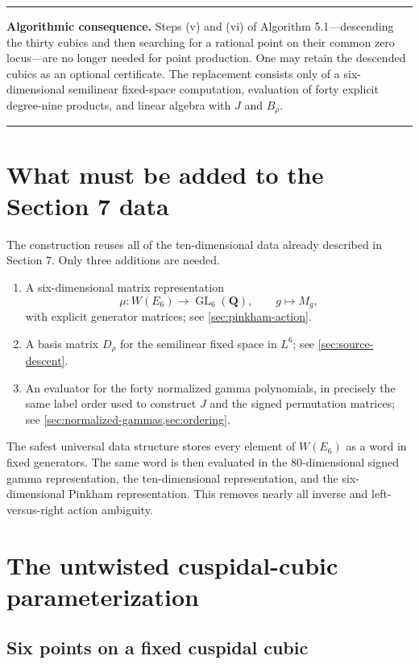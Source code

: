 \documentclass[11pt]{article}
\newcommand{\QQ}{\mathbf{Q}}
\newenvironment{summarybox}{%
  \begin{center}\begin{minipage}{0.94\textwidth}\small
  \hrule\vspace{0.55em}}{%
  \vspace{0.55em}\hrule\end{minipage}\end{center}}
\begin{document}
\begin{summarybox}
\textbf{Algorithmic consequence.}
Steps (v) and (vi) of Algorithm 5.1---descending the thirty cubics and then searching
for a rational point on their common zero locus---are no longer needed for point
production.  One may retain the descended cubics as an optional certificate.  The
replacement consists only of a six-dimensional semilinear fixed-space computation,
evaluation of forty explicit degree-nine products, and linear algebra with $J$ and
$B_\rho$.
\end{summarybox}

\section{What must be added to the Section 7 data}

The construction reuses all of the ten-dimensional data already described in
Section 7.  Only three additions are needed.

\begin{enumerate}
\item A six-dimensional matrix representation
\[
  \mu:W(E_6)\longrightarrow\operatorname{GL}_6(\QQ),
  \qquad g\longmapsto M_g,
\]
with explicit generator matrices; see \cref{sec:pinkham-action}.

\item A basis matrix $D_\rho$ for the semilinear fixed space in $L^6$; see
\cref{sec:source-descent}.

\item An evaluator for the forty normalized gamma polynomials, in precisely the
same label order used to construct $J$ and the signed permutation matrices; see
\cref{sec:normalized-gammas,sec:ordering}.
\end{enumerate}

The safest universal data structure stores every element of $W(E_6)$ as a word in
fixed generators.  The same word is then evaluated in the $80$-dimensional signed
gamma representation, the ten-dimensional representation, and the six-dimensional
Pinkham representation.  This removes nearly all inverse and left-versus-right
action ambiguity.

\section{The untwisted cuspidal-cubic parameterization}
\label{sec:cusp-map}

\subsection{Six points on a fixed cuspidal cubic}
\end{document}
